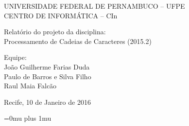 \documentclass[11pt]{article}
\begin{document}
\begin{center}
UNIVERSIDADE FEDERAL DE PERNAMBUCO – UFPE\\
CENTRO DE INFORMÁTICA – CIn\\[10\baselineskip]
\end{center}

\begin{center}
Relatório do projeto da disciplina:\\
Processamento de Cadeias de Caracteres
(2015.2)\\[10\baselineskip]
\end{center}
Equipe:\\
João Guilherme Farias Duda\\
Paulo de Barros e Silva Filho\\
Raul Maia Falcão\\[8\baselineskip]


\begin{center}
Recife, 10 de Janeiro de 2016
\end{center}

\cleardoublepage

\tableofcontents

\cleardoublepage










\Urlmuskip=0mu plus 1mu\relax


\end{document}
